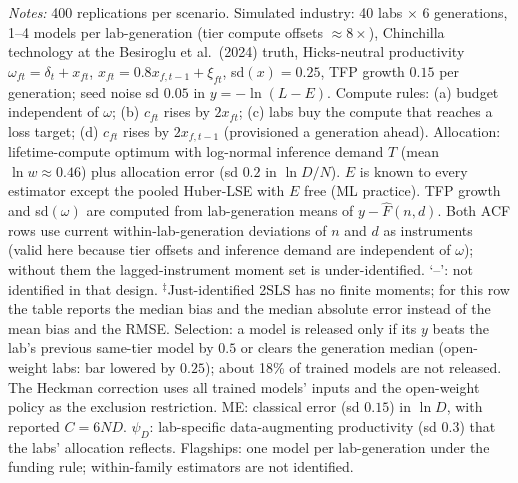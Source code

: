 \begin{table}[!htbp]
\begin{threeparttable}
\begin{tabular}{lrrrrrrrrrr}
\bottomrule
\end{tabular}
\begin{tablenotes}[flushleft]\footnotesize
\item \textit{Notes:} 400 replications per scenario. Simulated industry: 40 labs $\times$ 6 generations, 1--4 models per lab-generation (tier compute offsets $\approx 8\times$), Chinchilla technology at the Besiroglu et al.\ (2024) truth, Hicks-neutral productivity $\omega_{ft}=\delta_t+x_{ft}$, $x_{ft}=0.8x_{f,t-1}+\xi_{ft}$, sd$(x)=0.25$, TFP growth $0.15$ per generation; seed noise sd $0.05$ in $y=-\ln(L-E)$. Compute rules: (a) budget independent of $\omega$; (b) $c_{ft}$ rises by $2x_{ft}$; (c) labs buy the compute that reaches a loss target; (d) $c_{ft}$ rises by $2x_{f,t-1}$ (provisioned a generation ahead). Allocation: lifetime-compute optimum with log-normal inference demand $T$ (mean $\ln w\approx0.46$) plus allocation error (sd $0.2$ in $\ln D/N$). $E$ is known to every estimator except the pooled Huber-LSE with $E$ free (ML practice). TFP growth and sd$(\omega)$ are computed from lab-generation means of $y-\hat F(n,d)$. Both ACF rows use current within-lab-generation deviations of $n$ and $d$ as instruments (valid here because tier offsets and inference demand are independent of $\omega$); without them the lagged-instrument moment set is under-identified. `--': not identified in that design. $^{\ddagger}$Just-identified 2SLS has no finite moments; for this row the table reports the median bias and the median absolute error instead of the mean bias and the RMSE. Selection: a model is released only if its $y$ beats the lab's previous same-tier model by $0.5$ or clears the generation median (open-weight labs: bar lowered by $0.25$); about 18\% of trained models are not released. The Heckman correction uses all trained models' inputs and the open-weight policy as the exclusion restriction. ME: classical error (sd $0.15$) in $\ln D$, with reported $C=6ND$. $\psi_D$: lab-specific data-augmenting productivity (sd $0.3$) that the labs' allocation reflects. Flagships: one model per lab-generation under the funding rule; within-family estimators are not identified.
\end{tablenotes}
\end{threeparttable}
\end{table}

